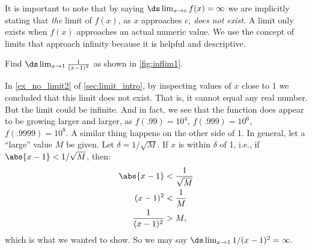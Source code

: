 It is important to note that by saying $\ds \lim_{x\to c}f(x) = \infty$ we are implicitly stating that \emph{the} limit of $f(x)$, as $x$ approaches $c$, \emph{does not exist.} A limit only exists when $f(x)$ approaches an actual numeric value. We use the concept of limits that approach infinity because it is helpful and descriptive.


\begin{example}\label{ex_inflim1}
Find $\ds \lim_{x\to1}\frac1{(x-1)^2}$ as shown in \autoref{fig:inflim1}.

\solution
In \autoref{ex_no_limit2} of \autoref{sec:limit_intro}, by inspecting values of $x$ close to 1 we concluded that this limit does not exist.  That is, it cannot equal any real number.  But the limit could be infinite.  And in fact, we see that the function does appear to be growing larger and larger, as $f(.99)=10^4$, $f(.999)=10^6$, $f(.9999)=10^8$.  A similar thing happens on the other side of 1.  In general, let a ``large'' value $M$ be given. Let $\delta=1/\sqrt{M}$. If $x$ is within $\delta$ of 1, i.e., if $\abs{x-1}<1/\sqrt{M}$, then:\vspace{-.5\baselineskip}
	\begin{align*}
	\abs{x-1} &< \frac{1}{\sqrt{M}} \\
	(x-1)^2 &< \frac{1}{M}\\
	\frac{1}{(x-1)^2} &> M,
	\end{align*}
	which is what we wanted to show.  So we may say $\ds\lim_{x\rightarrow 1}1/{(x-1)^2}=\infty$.
\end{example}


